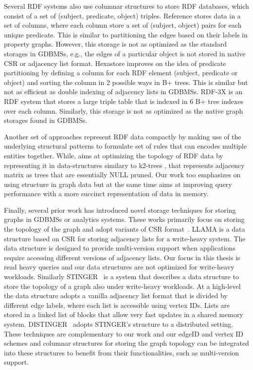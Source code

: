 Several RDF systems also use columnar structures to store RDF databases, which consist of a set of (subject, predicate, object) triples. Reference \cite{rdf-vertical} stores data in a set of columns, where each column store a set of (subject, object) pairs for each unique predicate. This is similar to partitioning the edges based on their labels in property graphs. However, this storage is not as optimized as the standard storages in GDBMSs, e.g., the edges of a particular object is not stored in native CSR or adjacency list format. Hexastore \cite{hexastore} improves on the idea of predicate partitioning by defining a column for each RDF element (subject, predicate or object) and sorting the column in 2 possible ways in B+ trees. This is similar but not as efficient as double indexing of adjacency lists in GDBMSs. RDF-3X \cite{rdf-3x} is an RDF system that stores a large triple table that is indexed in 6 B+ tree indexes over each column. Similarly, this storage is not as optimized as the native graph storages found in GDBMSs.

Another set of approaches \cite{comp-rdf, rbcomp, hdt} represent RDF data compactly by making use of the underlying structural patterns to formulate set of rules that can encodes multiple entities together. While, \cite{k2triples, ik2trees} aims at optimizing the topology of RDF data by representing it in data-structures similary to k2-trees \cite{k2trees}, that represents adjacency matrix as trees that are essentially NULL pruned. Our work too emphasizes on using structure in graph data but at the same time aims at improving query performance with a more succinct representation of data in memory.

Finally, several prior work has introduced novel storage techniques for storing graphs in GDBMSs or analytics systems. These works primarily focus on storing the topology of the graph and adopt variants of CSR format~\cite{yale}. LLAMA is a data structure based on CSR for storing adjacency lists for a write-heavy system. The data structure is designed to provide multi-version support when applications require accessing different versions of adjacency lists. Our focus in this thesis is read heavy queries and our data structures are not optimized for write-heavy workloads. Similarly STINGER~\cite{stinger} is a system that describes a data structure to store the topology of a graph also under write-heavy workloads. At a high-level the data structure adopts a vanilla adjacency list format that is divided by different edge labels, where each list is accessible using vertex IDs. Lists are stored in a linked list of blocks that allow very fast updates in a shared memory system. DISTINGER~\cite{distinger} adopts STINGER's structure to a distributed setting. These techniques are complementary to our work and our edgeID and vertex ID schemes and columnar structures for storing the graph topology can be integrated into these structures to benefit from their functionalities, such as multi-version support. 